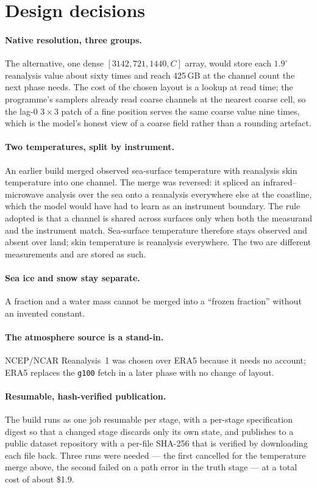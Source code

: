 \documentclass[10pt]{article}
\newcommand{\code}[1]{\texttt{#1}}
\begin{document}
\section{Design decisions}

\paragraph{Native resolution, three groups.} The alternative, one dense
$[3142, 721, 1440, C]$ array, would store each $1.9^\circ$ reanalysis value
about sixty times and reach 425\,GB at the channel count the next phase
needs. The cost of the chosen layout is a lookup at read time; the
programme's samplers already read coarse channels at the nearest coarse cell,
so the lag-0 $3\times3$ patch of a fine position serves the same coarse value
nine times, which is the model's honest view of a coarse field rather than a
rounding artefact.

\paragraph{Two temperatures, split by instrument.} An earlier build merged
observed sea-surface temperature with reanalysis skin temperature into one
channel. The merge was reversed: it spliced an infrared--microwave analysis
over the sea onto a reanalysis everywhere else at the coastline, which the
model would have had to learn as an instrument boundary. The rule adopted is
that a channel is shared across surfaces only when both the measurand and the
instrument match. Sea-surface temperature therefore stays observed and
absent over land; skin temperature is reanalysis everywhere. The two are
different measurements and are stored as such.

\paragraph{Sea ice and snow stay separate.} A fraction and a water mass
cannot be merged into a ``frozen fraction'' without an invented constant.

\paragraph{The atmosphere source is a stand-in.} NCEP/NCAR Reanalysis~1 was
chosen over ERA5 because it needs no account; ERA5 replaces the
\code{g100} fetch in a later phase with no change of layout.

\paragraph{Resumable, hash-verified publication.} The build runs as one job
resumable per stage, with a per-stage specification digest so that a changed
stage discards only its own state, and publishes to a public dataset
repository with a per-file SHA-256 that is verified by downloading each file
back. Three runs were needed --- the first cancelled for the temperature
merge above, the second failed on a path error in the truth stage --- at a
total cost of about \$1.9.
\end{document}
